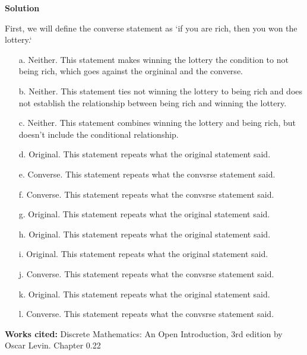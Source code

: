 \documentclass{article}
\begin{document}
\textbf{Solution}

First, we will define the converse statement as `if you are rich, then you won the lottery.`

\begin{enumerate}
    \item[a.] Neither. This statement makes winning the lottery the condition to not being rich, which goes against the orgininal and the converse.

    \item[b.] Neither. This statement ties not winning the lottery to being rich and does not establish the relationship between being rich and winning the lottery.

    \item[c.] Neither. This statement combines winning the lottery and being rich, but doesn't include the conditional relationship.

    \item[d.] Original. This statement repeats what the original statement said.

    \item[e.] Converse. This statement repeats what the convsrse statement said.

    \item[f.] Converse. This statement repeats what the convsrse statement said.

    \item[g.] Original. This statement repeats what the original statement said.

    \item[h.] Original. This statement repeats what the original statement said.

    \item[i.] Original. This statement repeats what the original statement said.

    \item[j.] Converse. This statement repeats what the convsrse statement said.

    \item[k.] Original. This statement repeats what the original statement said.

    \item[l.] Converse. This statement repeats what the convsrse statement said.
\end{enumerate}

\vspace{0.5cm}
\textbf{Works cited:}
Discrete Mathematics: An Open Introduction, 3rd edition by Oscar Levin. Chapter 0.22
\end{document}
